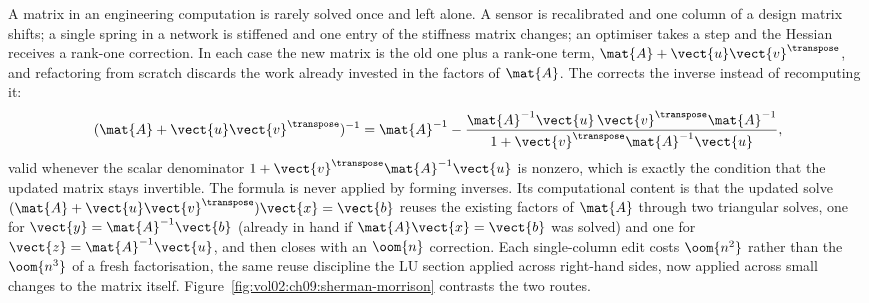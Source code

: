 A matrix in an engineering computation is rarely solved once and left
alone. A sensor is recalibrated and one column of a design matrix
shifts; a single spring in a network is stiffened and one entry of the
stiffness matrix changes; an optimiser takes a step and the Hessian
receives a rank-one correction. In each case the new matrix is the old
one plus a rank-one term, $\mat{A} + \vect{u}\vect{v}^{\transpose}$,
and refactoring from scratch discards the work already invested in the
factors of $\mat{A}$. The  corrects
the inverse instead of recomputing it:
\[
(\mat{A} + \vect{u}\vect{v}^{\transpose})^{-1} = \mat{A}^{-1} -
\frac{\mat{A}^{-1}\vect{u}\,\vect{v}^{\transpose}\mat{A}^{-1}}
{1 + \vect{v}^{\transpose}\mat{A}^{-1}\vect{u}},
\]
valid whenever the scalar denominator $1 + \vect{v}^{\transpose}
\mat{A}^{-1}\vect{u}$ is nonzero, which is exactly the condition that
the updated matrix stays invertible. The formula is never applied by
forming inverses. Its computational content is that the updated solve
$(\mat{A} + \vect{u}\vect{v}^{\transpose})\vect{x} = \vect{b}$ reuses
the existing factors of $\mat{A}$ through two triangular solves, one
for $\vect{y} = \mat{A}^{-1}\vect{b}$ (already in hand if $\mat{A}
\vect{x} = \vect{b}$ was solved) and one for $\vect{z} = \mat{A}^{-1}
\vect{u}$, and then closes with an $\oom{n}$ correction. Each
single-column edit costs $\oom{n^{2}}$ rather than the $\oom{n^{3}}$
of a fresh factorisation, the same reuse discipline the LU section
applied across right-hand sides, now applied across small changes to
the matrix itself. Figure~\ref{fig:vol02:ch09:sherman-morrison}
contrasts the two routes.



